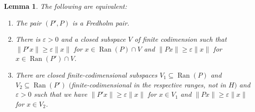 \documentclass[10pt,a4paper]{amsart}
\numberwithin{equation}{section}
\newtheorem{Lemma}[Theorem]{Lemma}
\DeclareMathOperator{\Ran}{Ran}
\begin{document}
\begin{Lemma}\label{11}
		The following are equivalent:
		\begin{enumerate}\itemsep=0pt
\item[$(1)$] The pair $({P'},P)$ is a Fredholm pair.
\item[$(2)$] There is $\varepsilon>0$ and a closed subspace $V$ of finite codimension such that  ${\|{P'}x\| \geq \varepsilon\|x\|}$ for $x\in \Ran(P)\cap V$ and $\|Px\|\geq\varepsilon\|x\|$ for $x\in \Ran({P'})\cap V$.
\item[$(3)$] There are closed finite-codimensional subspaces $V_1\subseteq \Ran(P)$ and $V_2\subseteq\Ran({P'})$ $($finite-codimensional in the respective ranges, not in $H)$ and $\varepsilon>0$ such that we have  $\|{P'}x\|\geq\varepsilon\|x\|$ for $x\in V_1$ and $\|Px\|\geq\varepsilon\|x\|$ for $x\in V_2$.
\end{enumerate}
\end{Lemma}
\end{document}
